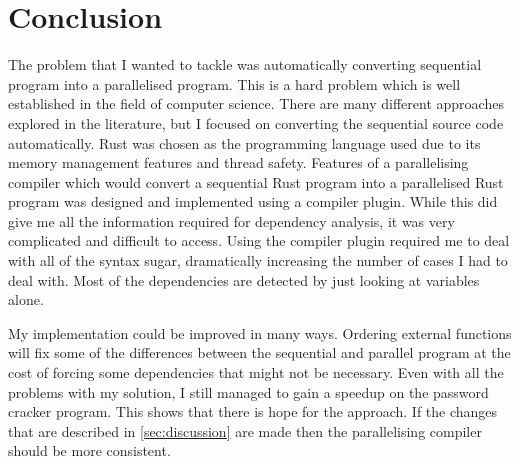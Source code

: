\chapter{Conclusion}
The problem that I wanted to tackle was automatically converting sequential program into a parallelised program. This is a hard problem which is well established in the field of computer science. There are many different approaches explored in the literature, but I focused on converting the sequential source code automatically. Rust was chosen as the programming language used due to its memory management features and thread safety. Features of a parallelising compiler which would convert a sequential Rust program into a parallelised Rust program was designed and implemented using a compiler plugin. While this did give me all the information required for dependency analysis, it was very complicated and difficult to access. Using the compiler plugin required me to deal with all of the syntax sugar, dramatically increasing the number of cases I had to deal with. Most of the dependencies are detected by just looking at variables alone.

My implementation could be improved in many ways. Ordering external functions will fix some of the differences between the sequential and parallel program at the cost of forcing some dependencies that might not be necessary. Even with all the problems with my solution, I still managed to gain a speedup on the password cracker program. This shows that there is hope for the approach. If the changes that are described in \autoref{sec:discussion} are made then the parallelising compiler should be more consistent.
